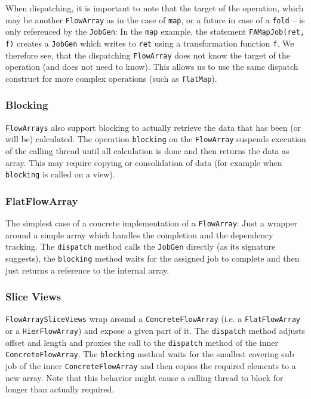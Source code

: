 \documentclass[runningheads,a4paper,fleqn]{llncs}
\begin{document}
When dispatching, it is important to note that the target of the
operation, which may be another \texttt{FlowArray} as in the case of
\texttt{map}, or a future in case of a \texttt{fold} -- is only
referenced by the \texttt{JobGen}: In the \texttt{map} example, the
statement \texttt{FAMapJob(ret, f)} creates a
\texttt{JobGen} which writes to \texttt{ret} using a transformation
function \texttt{f}. We therefore see, that the dispatching \texttt{FlowArray}
does not know the target of the operation (and does not need to
know). This allows us to use the same dispatch construct for more
complex operations (such as \texttt{flatMap}).

\subsubsection{Blocking}
\texttt{FlowArrays} also support blocking to actually retrieve the data that
has been (or will be) calculated. The operation \texttt{blocking} on
the \texttt{FlowArray} suspends execution of the calling thread until all
calculation is done and then returns the data as array. This may
require copying or consolidation of data (for example when
\texttt{blocking} is called on a view).

\subsubsection{FlatFlowArray}
The simplest case of a concrete implementation of a \texttt{FlowArray}: Just a
wrapper around a simple array which handles the completion and the
dependency tracking. The \texttt{dispatch} method calls the
\texttt{JobGen} directly (as its signature suggests), the
\texttt{blocking} method waits for the assigned job to complete and
then just returns a reference to the internal array.

\subsubsection{Slice Views}
\label{sssec:slice-views}
\texttt{FlowArraySliceViews} wrap around a \texttt{ConcreteFlowArray}
(i.e. a \texttt{FlatFlowArray} or a \texttt{HierFlowArray})
and expose a given part of it. The \texttt{dispatch} method adjusts 
offset and length and proxies the call to the \texttt{dispatch} method
of the inner
\texttt{ConcreteFlowArray}. The \texttt{blocking} method waits for the
smallest covering sub job of the inner \texttt{ConcreteFlowArray} and
then copies the required elements to a new array. Note that this
behavior might cause a calling thread to block for longer than
actually required.
\end{document}
